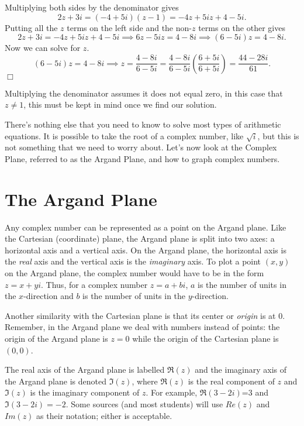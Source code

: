 \documentclass[../book.tex]{subfiles}
\begin{document}
\begin{solution}
Multiplying both sides by the denominator gives  $$2z+3i=\left(-4+5i\right)\left(z-1\right)=-4z+5iz+4-5i.$$  Putting all the $z$ terms on the left side and the non-$z$ terms on the other gives $$2z+3i=-4z+5iz+4-5i \implies 6z-5iz=4-8i \implies \left(6-5i\right)z=4-8i.$$ Now we can solve for $z$.  $$\left(6-5i\right)z=4-8i \implies z=\frac{4-8i}{6-5i}=\frac{4-8i}{6-5i}\left(\frac{6+5i}{6+5i}\right)=\frac{44-28i}{61}.$$$\Box$
\end{solution}
\begin{remark}
  Multiplying the denominator assumes it does not equal zero, in this case that $z\neq 1$, this must be kept in mind once we find our solution.
\end{remark}
\noindent There's nothing else that you need to know to solve most types of arithmetic equations.  It is possible to take the root of a complex number, like $\sqrt{i}$, but this is not something that we need to worry about.  Let's now look at the Complex Plane, referred to as the Argand Plane, and how to graph complex numbers.
\section{The Argand Plane}
\noindent Any complex number can be represented as a point on the Argand plane.  Like the Cartesian (coordinate) plane, the Argand plane is split into two axes: a horizontal axis and a vertical axis.  On the Argand plane, the horizontal axis is the \textit{real} axis and the vertical axis is the \textit{imaginary} axis.  To plot a point $(x,y)$ on the Argand plane, the complex number would have to be in the form $z=x+yi$.  Thus, for a complex number $z=a+bi$, $a$ is the number of units in the $x$-direction and $b$ is the number of units in the $y$-direction.

Another similarity with the Cartesian plane is that its center or \textit{origin} is at 0.  Remember, in the Argand plane we deal with numbers instead of points: the origin of the Argand plane is $z=0$ while the origin of the Cartesian plane is $(0,0)$.

The real axis of the Argand plane is labelled $\Re(z)$ and the imaginary axis of the Argand plane is denoted $\Im(z)$, where $\Re(z)$ is the real component of $z$ and $\Im(z)$ is the imaginary component of $z$.  For example, $\Re(3-2i)$=3 and $\Im(3-2i)=-2$.  Some sources (and most students) will use $Re(z)$ and $Im(z)$ as their notation; either is acceptable.
\end{document}
